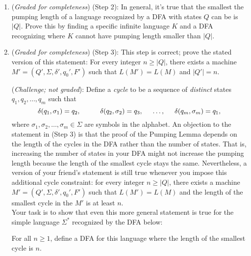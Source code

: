 \documentclass[12pt, oneside]{article}
\newcommand{\gradeComplete}{({\it Graded for completeness}) }
\begin{document}
\begin{enumerate}
\begin{enumerate}
    \item\gradeComplete (Step 2): 
    In general, it's true that the smallest the pumping length of a language
    recognized by a DFA with states $Q$ can be is $|Q|$. Prove this by finding a specific infinite language $K$ and a DFA recognizing 
    where $K$ cannot have pumping length smaller than $|Q|$.

    \item\gradeComplete (Step 3): This step is correct;
    prove the stated version of this statement: For every integer $n \ge |Q|$, there 
    exists a machine $M' = (Q', \Sigma, \delta', q_0', F')$ such that $L(M') = L(M)$ and $|Q'| = n$.

    (\textit{Challenge; not graded}): 
    Define a \emph{cycle} to be a sequence of \emph{distinct} states $q_1, q_2, \ldots, q_m$ such that
	\[
	\delta(q_1, \sigma_1) = q_2, \hspace{1cm} \delta(q_2, \sigma_2) = q_3, \hspace{.5cm} \ldots, \hspace{.5cm}\delta(q_m, \sigma_m) = q_1, 
	\]
	where $\sigma_1, \sigma_2, \ldots, \sigma_m \in \Sigma$ are symbols in the alphabet. 
    An objection to the statement in (Step 3) is that the proof of the Pumping Lemma 
    depends on the length of the cycles in the DFA rather than the number of states. That is, 
    increasing the number of states in your DFA might not increase the pumping length because 
    the length of the smallest cycle stays the same. Nevertheless, a version of your friend's statement 
    is still true whenever you impose this additional cycle constraint:  for every integer $n \ge |Q|$, 
    there exists a machine $M' = (Q', \Sigma, \delta', q_0', F')$ such that $L(M') = L(M)$ and the length 
    of the smallest cycle in the $M'$ is at least $n$. \\

	Your task is to show that even this more general statement is true for the simple language $\Sigma^*$ 
    recognized by the DFA below:
	\begin{center}
    \end{center}
	For all $n \ge 1$, define a DFA for this language where the length of the smallest cycle is $n$.


\end{enumerate}
\end{enumerate}
\end{document}
